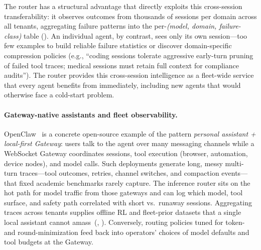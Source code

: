 The router has a structural advantage that directly exploits this
cross-session transferability: it observes outcomes from thousands
of sessions per domain across all tenants, aggregating failure
patterns into the per-\emph{(model, domain, failure-class)} table
().  An individual agent, by contrast, sees
only its own session---too few examples to build reliable failure
statistics or discover domain-specific compression policies (e.g.,
``coding sessions tolerate aggressive early-turn pruning of failed
tool traces; medical sessions must retain full context for compliance
audits'').  The router provides this cross-session intelligence as a
fleet-wide service that every agent benefits from immediately,
including new agents that would otherwise face a cold-start problem.

\paragraph{Gateway-native assistants and fleet observability.}
OpenClaw~\cite{openclaw2026} is a concrete open-source example of the
pattern \emph{personal assistant + local-first Gateway}: users talk
to the agent over many messaging channels while a WebSocket Gateway
coordinates sessions, tool execution (browser, automation, device
nodes), and model calls.  Such deployments generate long, messy
multi-turn traces---tool outcomes, retries, channel switches, and
compaction events---that fixed academic benchmarks rarely capture.
The inference router sits on the hot path for model traffic from
those gateways and can log which model, tool surface, and safety path
correlated with short vs.\ runaway sessions.  Aggregating traces
across tenants supplies offline RL and fleet-prior datasets that a
single local assistant cannot
amass~(, ).
Conversely, routing policies tuned for token- and round-minimization
feed back into operators' choices of model defaults and tool budgets
at the Gateway.

